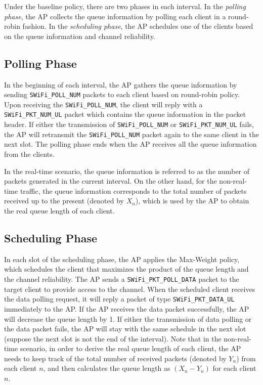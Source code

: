 \documentclass{article}
\begin{document}
\frenchspacing  Under the baseline policy, there are two phases in each interval. In the \emph{polling phase}, the AP collects the queue information by polling each client in a round-robin fashion. In the \emph{scheduling phase}, the AP schedules one of the clients based on the queue information and channel reliability.

\subsection{Polling Phase}
In the beginning of each interval, the AP gathers the queue information by sending \lstinline|SWiFi_POLL_NUM| packets to each client based on round-robin policy. Upon receiving the \lstinline|SWiFi_POLL_NUM|, the client will reply with a \lstinline|SWiFi_PKT_NUM_UL| packet which contains the queue information in the packet header. If either the transmission of \lstinline|SWiFi_POLL_NUM| or \lstinline|SWiFi_PKT_NUM_UL| fails, the AP will retransmit the \lstinline|SWiFi_POLL_NUM| packet again to the same client in the next slot. 
The polling phase ends when the AP receives all the queue information from the clients.

In the real-time scenario, the queue information is referred to as the number of packets generated in the current interval. On the other hand, for the non-real-time traffic, the queue information corresponds to the total number of packets received up to the present (denoted by $X_n$), which is used by the AP to obtain the real queue length of each client.    

\subsection{Scheduling Phase}
In each slot of the scheduling phase, the AP applies the Max-Weight policy, which schedules the client that maximizes the product of the queue length and the channel reliability. The AP sends a \lstinline|SWiFi_PKT_POLL_DATA| packet to the target client to provide access to the channel. When the scheduled client receives the data polling request, it will reply a packet of type \lstinline|SWiFi_PKT_DATA_UL| immediately to the AP. If the AP receives the data packet successfully, the AP will decrease the queue length by 1. If either the transmission of data polling or the data packet fails, the AP will stay with the same schedule in the next slot (suppose the next slot is not the end of the interval). Note that in the non-real-time scenario, in order to derive the real queue length of each client, the AP needs to keep track of the total number of received packets (denoted by $Y_n$) from each client $n$, and then calculates the queue length as $(X_n - Y_n)$ for each client $n$.
\end{document}
